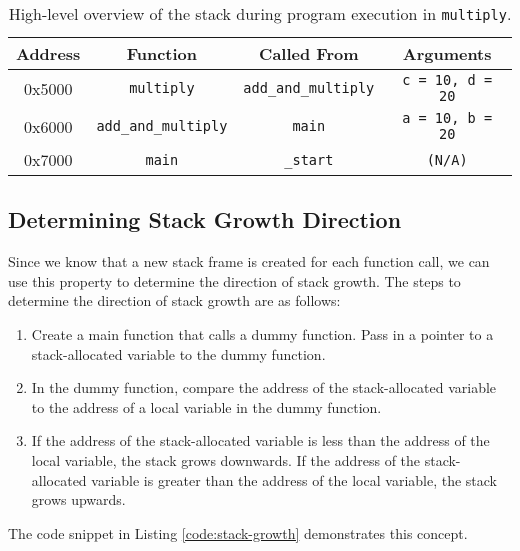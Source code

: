 \documentclass[main.tex]{subfiles}
\begin{document}
\begin{table}[H]
    \centering
    \begin{tabular}{|c|c|c|c|}
    \hline
    \textbf{Address} & \textbf{Function}            & \textbf{Called From}   & \textbf{Arguments}        \\ \hline
    0x5000           & \texttt{multiply}           & \texttt{add\_and\_multiply} & \texttt{c = 10, d = 20}   \\ \hline
    0x6000           & \texttt{add\_and\_multiply} & \texttt{main}           & \texttt{a = 10, b = 20}   \\ \hline
    0x7000           & \texttt{main}               & \texttt{\_start}        & \texttt{(N/A)}            \\ \hline
    \end{tabular}
    \caption{High-level overview of the stack during program execution in \texttt{multiply}.}
    \label{table:stack_overview}
\end{table}

\subsection{Determining Stack Growth Direction}
Since we know that a new stack frame is created for each function call, we can use this property to determine the direction of stack growth. The steps to determine the direction of stack growth are as follows:
\begin{enumerate}
    \item Create a main function that calls a dummy function. Pass in a pointer to a stack-allocated variable to the dummy function.
    \item In the dummy function, compare the address of the stack-allocated variable to the address of a local variable in the dummy function.
    \item If the address of the stack-allocated variable is less than the address of the local variable, the stack grows downwards. If the address of the stack-allocated variable is greater than the address of the local variable, the stack grows upwards.
\end{enumerate}
\noindent The code snippet in Listing \ref{code:stack-growth} demonstrates this concept.


    
\end{document}
